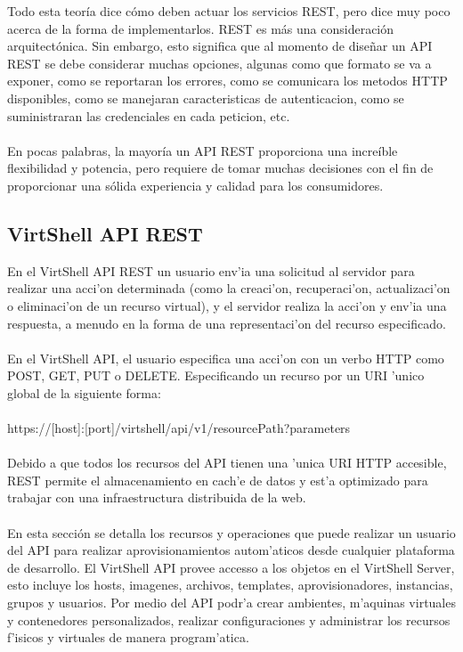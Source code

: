 Todo esta teoría dice cómo deben actuar los servicios REST, pero dice muy poco acerca de la forma de implementarlos. REST es más una consideración arquitectónica. Sin embargo, esto significa que al momento de diseñar un API REST se debe considerar muchas opciones, algunas como que formato se va a exponer, como se reportaran los errores, como se comunicara los metodos HTTP disponibles, como se manejaran caracteristicas de autenticacion, como se suministraran las credenciales en cada peticion, etc.\\
\\
En pocas palabras, la mayoría un API REST proporciona una increíble flexibilidad y potencia, pero requiere de tomar muchas decisiones con el fin de proporcionar una sólida experiencia y calidad para los consumidores.

\subsection{VirtShell API REST}
En el VirtShell API REST un usuario env'ia una solicitud al servidor para realizar una acci'on determinada (como la creaci'on, recuperaci'on, actualizaci'on o eliminaci'on de un recurso virtual), y el servidor realiza la acci'on y env'ia una respuesta, a menudo en la forma de una representaci'on del recurso especificado.\\
\\
En el VirtShell API, el usuario especifica una acci'on con un verbo HTTP como POST, GET, PUT o DELETE. Especificando un recurso por un URI 'unico global de la siguiente forma: \\
\\
https://[host]:[port]/virtshell/api/v1/resourcePath?parameters\\
\\
Debido a que todos los recursos del API tienen una 'unica URI HTTP accesible, REST permite el almacenamiento en cach'e de datos y est'a optimizado para trabajar con una infraestructura distribuida de la web.\\
\\
En esta sección se detalla los recursos y operaciones que puede realizar un usuario del API para realizar aprovisionamientos autom'aticos desde cualquier plataforma de desarrollo. El VirtShell API provee accesso a los objetos en el VirtShell Server, esto incluye los hosts, imagenes, archivos, templates, aprovisionadores, instancias, grupos y usuarios. Por medio del API podr'a crear ambientes, m'aquinas virtuales y contenedores personalizados, realizar configuraciones y administrar los recursos f'isicos y virtuales de manera program'atica. \\

